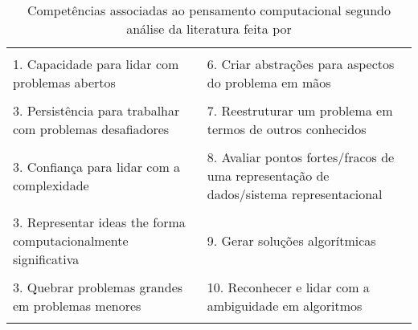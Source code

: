
\begin{table}[!htb]
  \caption{Competências associadas ao pensamento computacional segundo análise da literatura feita por }
  \label{tab:ten-skills}

  \begin{center}
    \begin{tabularx}{\textwidth}{XX}
      \hline
      \\
      1. Capacidade para lidar com problemas abertos & 6. Criar abstrações para aspectos do problema em mãos 
      \\
      
      \\
      3. Persistência para trabalhar com problemas desafiadores & 7. Reestruturar um problema em termos de outros conhecidos 
      \\

      \\
      3. Confiança para lidar com a complexidade & 8. Avaliar pontos fortes/fracos de uma representação de dados/sistema representacional
      \\

      \\
      3. Representar ideas the forma computacionalmente significativa & 9. Gerar soluções algorítmicas
      \\

      \\
      3. Quebrar problemas grandes em problemas menores & 10. Reconhecer e lidar com a ambiguidade em algoritmos
      \\\\
      \hline
    \end{tabularx}
  \end{center}
\end{table}
